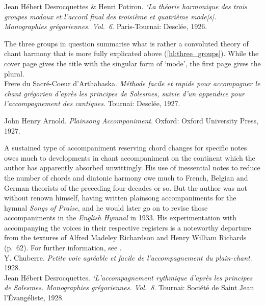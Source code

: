     \parindent=0pt
    \hangindent=0pt
  Jean Hébert Desrocquettes \& Henri Potiron. \emph{\emph{`La théorie harmonique des trois groupes modaux et l'accord final des troisième et quatrième mode[s].} Monographies grégoriennes. \emph{Vol.~6}}. Paris-Tournai:  Desclée, 1926.

     \parindent=20pt
     \hangindent=20pt
     The three groups in question summarise what is rather a convoluted theory of chant harmony that is more fully explicated above (\cref{hl:three_groups}). While the cover page gives the title with the singular form of `mode', the first page gives the plural.\\

    \parindent=0pt
    \hangindent=0pt
  \covid{}Frere du Sacré-Coeur d'Arthabaska. \emph{Méthode facile et rapide pour accompagner le chant grégorien d'après les principes de Solesmes, suivie d'un appendice pour l'accompagnement des cantiques}. Tournai:  Desclée, 1927. \\\pagebreak{}

    \parindent=0pt
    \hangindent=0pt
  John Henry Arnold. \emph{Plainsong Accompaniment}. Oxford:  Oxford University Press, 1927.

     \parindent=20pt
     \hangindent=20pt
     A sustained type of accompaniment reserving chord changes for specific notes owes much to developments in chant accompaniment on the continent which the author has apparently absorbed unwittingly. His use of inessential notes to reduce the number of chords and diatonic harmony owe much to French, Belgian and German theorists of the preceding four decades or so. But the author was not without renown himself, having written plainsong accompaniments for the hymnal \emph{Songs of Praise}, and he would later go on to revise those accompaniments in the \emph{English Hymnal} in 1933. His experimentation with accompanying the voices in their respective registers is a noteworthy departure from the textures of Alfred Madeley Richardson and Henry William Richards (p.~62). For further information, see \cite{HarperEnglishHymnalLiturgical2005}.\\

    \parindent=0pt
    \hangindent=0pt
  \covid{}Y. Chuberre. \emph{Petite voie agréable et facile de l'accompagnement du plain-chant}. 1928. \\

    \parindent=0pt
    \hangindent=0pt
  Jean Hébert Desrocquettes. \emph{\emph{`L'accompagnement rythmique d'après les principes de Solesmes.} Monographies grégoriennes. \emph{Vol.~8}}. Tournai:  Société de Saint Jean l'Évangéliste, 1928.

